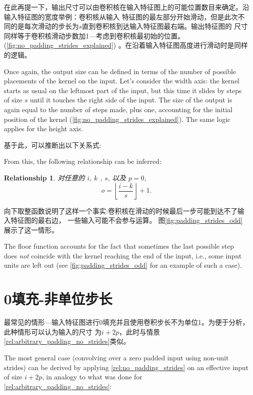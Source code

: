 \documentclass[notitlepage]{report}
\newtheorem{relationship}{Relationship}
\begin{document}
在此再提一下，输出尺寸可以由卷积核在输入特征图上的可能位置数目来确定。沿输入特征图的宽度举例：卷积核从输入
特征图的最左部分开始滑动，但是此次不同的是每次滑动的步长为$s$直到卷积核到达输入特征图最右端。输出特征图的
尺寸同样等于卷积核滑动步数加1---考虑到卷积核最初始的位置。(\autoref{fig:no_padding_strides_explained})
。在沿着输入特征图高度进行滑动时是同样的逻辑。

Once again, the output size can be defined in terms of the number of possible
placements of the kernel on the input. Let's consider the width axis: the
kernel starts as usual on the leftmost part of the input, but this time it
slides by steps of size $s$ until it touches the right side of the input. The
size of the output is again equal to the number of steps made, plus one,
accounting for the initial position of the kernel
(\autoref{fig:no_padding_strides_explained}). The same logic applies for the
height axis.

基于此，可以推断出以下关系式:

From this, the following relationship can be inferred:

\begin{relationship}\label{rel:no_padding_strides}
对任意的 $i$, $k$ , $s$, 以及 $p = 0$,
\begin{equation*}
    o = \left\lfloor \frac{i - k}{s} \right\rfloor + 1.
\end{equation*}
\end{relationship}

\noindent 向下取整函数说明了这样一个事实:卷积核在滑动的时候最后一步可能到达不了输入特征图的最右边，
一些输入可能不会参与运算。
图\autoref{fig:padding_strides_odd}展示了这一情形。


\noindent The floor function accounts for the fact that sometimes the last
possible step does {\em not\/} coincide with the kernel reaching the end of the
input, i.e., some input units are left out (see
\autoref{fig:padding_strides_odd} for an example of such a case).

\section{0填充-非单位步长}

最常见的情形---输入特征图进行0填充并且使用卷积步长不为单位1。为便于分析，此种情形可以认为输入的尺寸
为$i + 2p$，此时与情景\autoref{rel:arbitrary_padding_no_strides}类似。

The most general case (convolving over a zero padded input using non-unit
strides) can be derived by applying \autoref{rel:no_padding_strides} on an
effective input of size $i + 2p$, in analogy to what was done for
\autoref{rel:arbitrary_padding_no_strides}:
\end{document}
